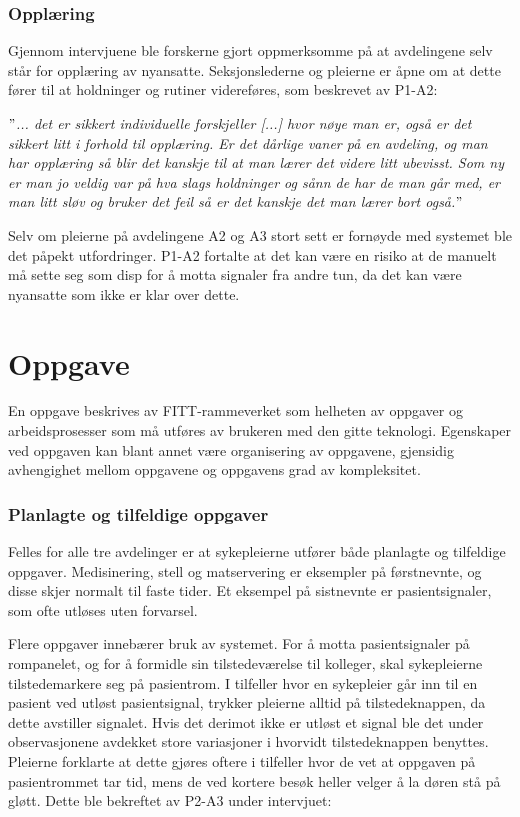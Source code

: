 \subsubsection{Opplæring}
Gjennom intervjuene ble forskerne gjort oppmerksomme på at avdelingene selv står for opplæring av nyansatte. Seksjonslederne og pleierne er åpne om at dette fører til at holdninger og rutiner videreføres, som beskrevet av P1-A2:

\noindent
\textit{$"$... det er sikkert individuelle forskjeller [...] hvor nøye man er, også er det sikkert litt i forhold til opplæring. Er det dårlige vaner på en avdeling, og man har opplæring så blir det kanskje til at man lærer det videre litt ubevisst. Som ny er man jo veldig var på hva slags holdninger og sånn de har de man går med, er man litt sløv og bruker det feil så er det kanskje det man lærer bort også.$"$}

\noindent
Selv om pleierne på avdelingene A2 og A3 stort sett er fornøyde med systemet ble det påpekt utfordringer. P1-A2 fortalte at det kan være en risiko at de manuelt må sette seg som disp for å motta signaler fra andre tun, da det kan være nyansatte som ikke er klar over dette.  

\section{Oppgave}
En oppgave beskrives av FITT-rammeverket som helheten av oppgaver og arbeidsprosesser som må utføres av brukeren med den gitte teknologi. Egenskaper ved oppgaven kan blant annet være organisering av oppgavene, gjensidig avhengighet mellom oppgavene og oppgavens grad av kompleksitet.

\subsubsection{Planlagte og tilfeldige oppgaver}
Felles for alle tre avdelinger er at sykepleierne utfører både planlagte og tilfeldige oppgaver. Medisinering, stell og matservering er eksempler på førstnevnte, og disse skjer normalt til faste tider. Et eksempel på sistnevnte er pasientsignaler, som ofte utløses uten forvarsel.  

\noindent
Flere oppgaver innebærer bruk av systemet. For å motta pasientsignaler på rompanelet, og for å formidle sin tilstedeværelse til kolleger, skal sykepleierne tilstedemarkere seg på pasientrom. I tilfeller hvor en sykepleier går inn til en pasient ved utløst pasientsignal, trykker pleierne alltid på tilstedeknappen, da dette avstiller signalet. Hvis det derimot ikke er utløst et signal ble det under observasjonene avdekket store variasjoner i hvorvidt tilstedeknappen benyttes. Pleierne forklarte at dette gjøres oftere i tilfeller hvor de vet at oppgaven på pasientrommet tar tid, mens de ved kortere besøk heller velger å la døren stå på gløtt. Dette ble bekreftet av P2-A3 under intervjuet: 

